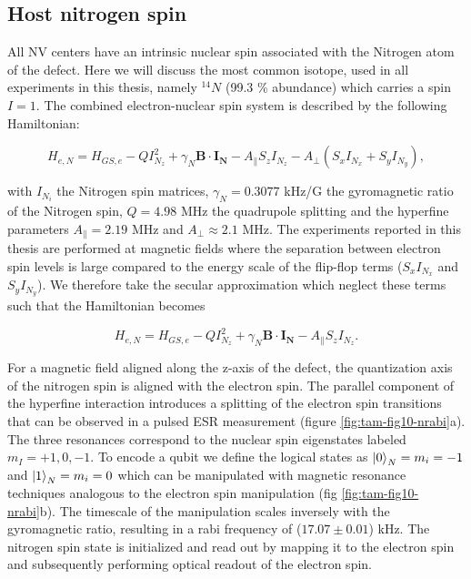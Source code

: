 \subsection{Host nitrogen spin}
All NV centers have an intrinsic nuclear spin associated with the Nitrogen atom of the defect. Here we will discuss the most common isotope, used in all experiments in this thesis, namely $^{14}N$ (99.3 $\%$ abundance) which carries a spin $I = 1$. The combined electron-nuclear spin system is described by the following Hamiltonian:

\begin{equation}
H_{e,N} = H_{GS,e} - Q I_{N_z}^2 + \gamma_N \mathbf{B} \cdot \mathbf{I_N} - A_{\parallel} S_z I_{N_z} - A_{\perp}(S_x I_{N_x}+S_y I_{N_y}),
\end{equation}

with $I_{N_i}$ the Nitrogen spin matrices, $\gamma_N = 0.3077$ kHz/G the gyromagnetic ratio of the Nitrogen spin, $Q = 4.98$ MHz the quadrupole splitting and the hyperfine parameters $A_{\parallel} = 2.19$ MHz and $A_{\perp} \approx 2.1$ MHz. The experiments reported in this thesis are performed at magnetic fields where the separation between electron spin levels is large compared to the energy scale of the flip-flop terms ($S_x I_{N_x}$ and $S_y I_{N_y}$). We therefore take the secular approximation which neglect these terms such that the Hamiltonian becomes

\begin{equation}
H_{e,N} = H_{GS,e} - Q I_{N_z}^2 + \gamma_N \mathbf{B} \cdot \mathbf{I_N} - A_{\parallel} S_z I_{N_z}.
\end{equation}

For a magnetic field aligned along the z-axis of the defect, the quantization axis of the nitrogen spin is aligned with the electron spin. The parallel component of the hyperfine interaction introduces a splitting of the electron spin transitions that can be observed in a pulsed ESR measurement (figure \ref{fig:tam-fig10-nrabi}a). The three resonances correspond to the nuclear spin eigenstates labeled $m_I = +1, 0, -1$. To encode a qubit we define the logical states as $\left|0\right>_N = m_i = -1$ and $\left|1\right>_N = m_i = 0$ which can be manipulated with magnetic resonance techniques analogous to the electron spin manipulation (fig \ref{fig:tam-fig10-nrabi}b). The timescale of the manipulation scales inversely with the gyromagnetic ratio, resulting in a rabi frequency of ($17.07 \pm 0.01$) kHz. The nitrogen spin state is initialized and read out by mapping it to the electron spin and subsequently performing optical readout of the electron spin.

